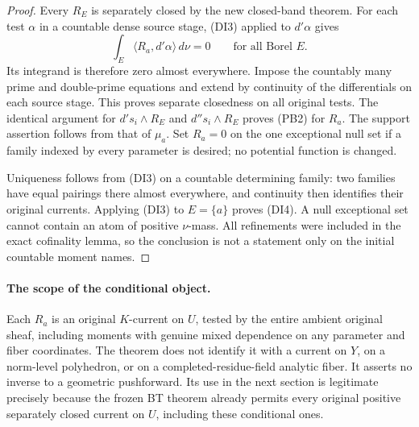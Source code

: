 \begin{proof}
Every $R_E$ is separately closed by the new closed-band theorem.
For each test $\alpha$ in a countable dense source stage,
(DI3) applied to $d'\alpha$ gives
\[
                      \int_E\langle R_a,d'\alpha\rangle\,d\nu=0
                           \qquad\text{for all Borel }E.
\]
Its integrand is therefore zero almost everywhere. Impose the
countably many prime and double-prime equations and extend by
continuity of the differentials on each source stage. This proves
separate closedness on all original tests. The identical argument
for $d's_i\wedge R_E$ and $d''s_i\wedge R_E$ proves (PB2) for
$R_a$. The support assertion follows from that of $\mu_a$.
Set $R_a=0$ on the one exceptional null set if a family indexed by
every parameter is desired; no potential function is changed.

Uniqueness follows from (DI3) on a countable determining family:
two families have equal pairings there almost everywhere, and
continuity then identifies their original currents. Applying (DI3)
to $E=\{a\}$ proves (DI4). A null exceptional set cannot contain
an atom of positive $\nu$-mass. All refinements were included in
the exact cofinality lemma, so the conclusion is not a statement
only on the initial countable moment names.
\end{proof}

\paragraph{The scope of the conditional object.}
Each $R_a$ is an original $K$-current on $U$, tested by the entire
ambient original sheaf, including moments with genuine mixed
dependence on any parameter and fiber coordinates. The theorem
does not identify it with a current on $Y$, on a norm-level
polyhedron, or on a completed-residue-field analytic fiber.
It asserts no inverse to a geometric pushforward. Its use in the
next section is legitimate precisely because the frozen BT theorem
already permits every original positive separately closed current
on $U$, including these conditional ones.
